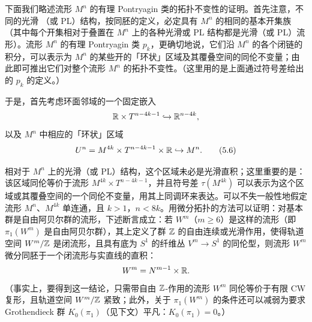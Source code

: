 下面我们略述流形 $M^{n}$ 的有理 Pontryagin 类的拓扑不变性的证明。首先注意，不同的光滑
（或 PL）结构，按同胚的定义，必定具有 $M^{n}$ 的相同的基本开集族（其中每个开集相对于叠置在 $M^{n}$ 上的各种光滑或 PL 结构都是光滑（或 PL）流形）。流形 $M^{n}$ 的有理 Pontryagin 类 $p_{k}$，更确切地说，它们沿 $M^{n}$ 的各个闭链的积分，可以表示为 $M^{n}$ 的某些开的「环状」区域及其覆叠空间的同伦不变量；由此即可推出它们对整个流形 $M^{n}$ 的拓扑不变性。（这里用的是上面通过符号差给出的 $p_{k}$ 的定义。）

于是，首先考虑环面邻域的一个固定嵌入
\[
\mathbb{R}\times T^{n-4k-1}\hookrightarrow\mathbb{R}^{n-4k},
\]
以及 $M^{n}$ 中相应的「环状」区域
\begin{equation}
U^{n}=M^{4k}\times T^{n-4k-1}\times\mathbb{R}\hookrightarrow M^{n}. \tag{5.6}
\end{equation}

相对于 $M^{n}$ 上的光滑（或 PL）结构，这个区域未必是光滑直积；这里重要的是：该区域同伦等价于流形 $M^{4k}\times T^{n-4k-1}$，并且符号差 $\tau(M^{4k})$ 可以表示为这个区域或其覆叠空间的一个同伦不变量，用其上同调环来表达。可以不失一般性地假定流形 $M^{n}$、$M^{4k}$ 单连通，且 $k>1$，$n<8k$。用微分拓扑的方法可以证明：对基本群是自由阿贝尔群的流形，下述断言成立：若 $W^{m}$（$m\ge 6$）是这样的流形（即 $\pi_{1}(W^{m})$ 是自由阿贝尔群），其上定义了群 $\mathbb{Z}$ 的自由连续或光滑作用，使得轨道空间 $W^{m}/\mathbb{Z}$ 是闭流形，且具有底为 $S^{1}$ 的纤维丛 $V^{m}\to S^{1}$ 的同伦型，则流形 $W^{m}$ 微分同胚于一个闭流形与实直线的直积：
\[
W^{m}=N^{m-1}\times\mathbb{R}.
\]
（事实上，要得到这一结论，只需带自由 $\mathbb{Z}$-作用的流形 $W^{m}$ 同伦等价于有限 CW 复形，且轨道空间 $W^{m}/\mathbb{Z}$ 紧致；此外，关于 $\pi_{1}(W^{m})$ 的条件还可以减弱为要求 Grothendieck 群 $K_{0}(\pi_{1})$（见下文）平凡：$K_{0}(\pi_{1})=0$。）

